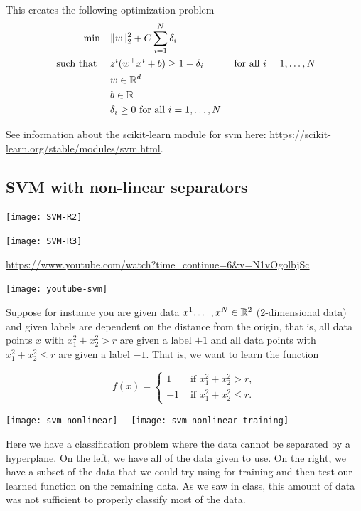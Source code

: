 \documentclass[../open-optimization/open-optimization.tex]{subfiles}
\begin{document}
This creates the following optimization problem
\begin{align*}
\min \quad & \|w\|_2^2+ C \sum_{i=1}^N \delta_i \\
\text{ such that } \quad & z^i( w^\top x^i + b) \geq 1  - \delta_i& \text{ for all } i=1, \dots, N\\
& w  \in {\mathbb{R}}^d\\
& b \in {\mathbb{R}}\\
& \delta_i \geq 0  \text { for all } i =1, \dots, N
\end{align*}


See information about the scikit-learn module for svm here:
\url{https://scikit-learn.org/stable/modules/svm.html}.

\subsection{SVM with non-linear separators}


\texttt{[image: SVM-R2]}



\texttt{[image: SVM-R3]}\footnotemark


\url{https://www.youtube.com/watch?time_continue=6&v=N1vOgolbjSc}

\texttt{[image: youtube-svm]}



Suppose for instance you are given data $x^1, \dots, x^N \in {\mathbb{R}}^2$ (2-dimensional data) and given labels are dependent on the distance from the origin, that is,  all data points $x$ with  $x_1^2 + x_2^2 > r$ are given a label $+1$ and all data points with $x_1^2 + x_2^2 \leq r$ are given a label $-1$.   That is, we want to learn the function 

\begin{equation}
f(x) = \begin{cases}
1 & \text{ if } x_1^2 + x_2^2 >  r,\\
-1 & \text{ if } x_1^2 + x_2^2 \leq r.
\end{cases}
\end{equation}

\begin{example}
\begin{center}
\texttt{[image: svm-nonlinear]} \ \ \texttt{[image: svm-nonlinear-training]}
\end{center}
Here we have a classification problem where the data cannot be separated by a hyperplane.  On the left, we have all of the data given to use.  On the right, we have a subset of the data that we could try using for training and then test our learned function on the remaining data.  As we saw in class, this amount of data was not sufficient to properly classify most of the data.
\end{example}
\end{document}
